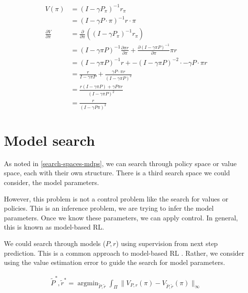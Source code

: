 \begin{align*}
V(\pi) &= (I − \gamma P_{\pi})^{−1}r_{\pi} \tag{value functional}\\
&= (I − \gamma P\cdot \pi)^{−1}r\cdot \pi \\
\frac{\partial V}{\partial \pi} &= \frac{\partial}{\partial \pi}((I-\gamma P_{\pi})^{-1} r_{\pi}) \\
&= (I-\gamma \pi P)^{-1} \frac{\partial \pi r}{\partial \pi}+   \frac{\partial (I-\gamma \pi P)^{-1}}{\partial \pi}\pi r\tag{product rule} \\
&= (I-\gamma \pi P)^{-1} r + -(I-\gamma \pi P)^{-2} \cdot -\gamma P\cdot \pi r\\
&= \frac{r}{I-\gamma \pi P} + \frac{ \gamma P\cdot \pi r}{(I-\gamma \pi P)^2} \tag{rewrite as fractions}\\
&= \frac{r(I-\gamma \pi P) + \gamma P \pi r}{(I-\gamma \pi P)^2} \tag{common demoninator}\\
& = \frac{r}{(I-\gamma P \pi)^2} \tag{cancel}
\end{align*}

\newpage
\section{Model search} \label{model-iteration}

As noted in \ref{search-spaces-mdps}, we can search through policy space or value
space, each with their own structure.
There is a third search space we could consider, the model parameters.

However, this problem is not a control problem like the search for values or policies.
This is an inference problem, we are trying to infer the model parameters.
Once we know these parameters, we can apply control.
In general, this is known as model-based RL.

We could search through models ($P, r$) using supervision from next step prediction.
This is a common approach to model-based RL \cite{Wang2019a}.
Rather, we consider using the value estimation error to guide the search for model parameters.

\begin{align}
\tilde P^{* }, \tilde r^{* } = \mathop{\text{argmin}}_{\tilde P, \tilde r} \int_{\Pi} \parallel V_{P, r}(\pi)-V_{\tilde P, \tilde r}(\pi) \parallel_\infty
\end{align}

